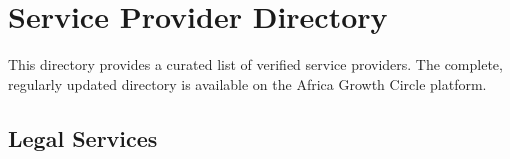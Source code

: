 
\chapter{Service Provider Directory}\label{ch:service-provider-directory}

\begin{importantbox}
This directory provides a curated list of verified service providers. The complete, regularly updated directory is available on the Africa Growth Circle platform.
\end{importantbox}

\vspace{2em}

\section{Legal Services}\label{sec:legal-services}
\vspace{1em}


